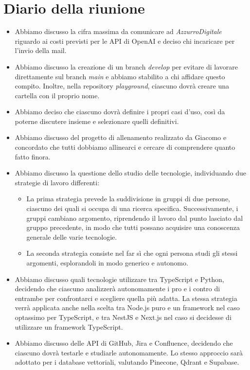 
\section{Diario della riunione}

\begin{itemize}
    \item Abbiamo discusso la cifra massima da comunicare ad \emph{AzzurroDigitale} riguardo ai costi previsti per le API di OpenAI e deciso chi incaricare per l'invio della mail.

    \item Abbiamo discusso la creazione di un branch \emph{develop} per evitare di lavorare direttamente sul branch \emph{main} e abbiamo stabilito a chi affidare questo compito. Inoltre, nella repository \emph{playground}, ciascuno dovrà creare una cartella con il proprio nome.

    \item  Abbiamo deciso che ciascuno dovrà definire i propri casi d'uso, così da poterne discutere insieme e selezionare quelli definitivi.
    
    \item Abbiamo discusso del progetto di allenamento realizzato da Giacomo e concordato che tutti dobbiamo allinearci e cercare di comprendere quanto fatto finora.
    
    \item Abbiamo discusso la questione dello studio delle tecnologie, individuando due strategie di lavoro differenti:
    \begin{itemize}
        \item La prima strategia prevede la suddivisione in gruppi di due persone, ciascuno dei quali si occupa di una ricerca specifica. Successivamente, i gruppi cambiano argomento, riprendendo il lavoro dal punto lasciato dal gruppo precedente, in modo che tutti possano acquisire una conoscenza generale delle varie tecnologie.
        \item La seconda strategia consiste nel far sì che ogni persona studi gli stessi argomenti, esplorandoli in modo generico e autonomo.
    \end{itemize}

    \item Abbiamo discusso quali tecnologie utilizzare tra TypeScript e Python, decidendo che ciascuno analizzerà autonomamente i pro e i contro di entrambe per confrontarci e scegliere quella più adatta. La stessa strategia verrà applicata anche nella scelta tra Node.js puro e un framework nel caso optassimo per TypeScript, e tra NestJS e Next.js nel caso si decidesse di utilizzare un framework TypeScript.
    
    \item Abbiamo discusso delle API di GitHub, Jira e Confluence, decidendo che ciascuno dovrà testarle e studiarle autonomamente. Lo stesso approccio sarà adottato per i database vettoriali, valutando Pinecone, Qdrant e Supabase.
\end{itemize}
